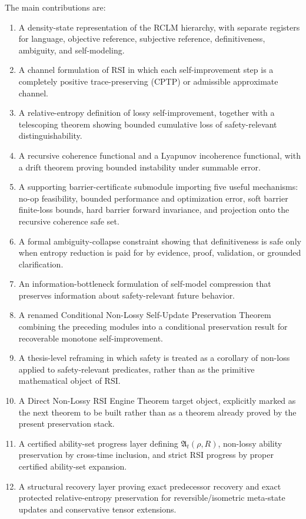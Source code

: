 \documentclass[11pt]{article}
\newcommand{\1}{\mathbf{1}}
\begin{document}
The main contributions are:
\begin{enumerate}[label=(\roman*)]
    \item A density-state representation of the RCLM hierarchy, with separate registers for language, objective reference, subjective reference, definitiveness, ambiguity, and self-modeling.
    \item A channel formulation of RSI in which each self-improvement step is a completely positive trace-preserving (CPTP) or admissible approximate channel.
    \item A relative-entropy definition of lossy self-improvement, together with a telescoping theorem showing bounded cumulative loss of safety-relevant distinguishability.
    \item A recursive coherence functional and a Lyapunov incoherence functional, with a drift theorem proving bounded instability under summable error.
    \item A supporting barrier-certificate submodule importing five useful mechanisms: no-op feasibility, bounded performance and optimization error, soft barrier finite-loss bounds, hard barrier forward invariance, and projection onto the recursive coherence safe set.
    \item A formal ambiguity-collapse constraint showing that definitiveness is safe only when entropy reduction is paid for by evidence, proof, validation, or grounded clarification.
    \item An information-bottleneck formulation of self-model compression that preserves information about safety-relevant future behavior.
    \item A renamed Conditional Non-Lossy Self-Update Preservation Theorem combining the preceding modules into a conditional preservation result for recoverable monotone self-improvement.
    \item A thesis-level reframing in which safety is treated as a corollary of non-loss applied to safety-relevant predicates, rather than as the primitive mathematical object of RSI.
    \item A Direct Non-Lossy RSI Engine Theorem target object, explicitly marked as the next theorem to be built rather than as a theorem already proved by the present preservation stack.
    \item A certified ability-set progress layer defining \(\mathfrak A_t(\rho,R)\), non-lossy ability preservation by cross-time inclusion, and strict RSI progress by proper certified ability-set expansion.
    \item A structural recovery layer proving exact predecessor recovery and exact protected relative-entropy preservation for reversible/isometric meta-state updates and conservative tensor extensions.

\end{enumerate}
\end{document}
